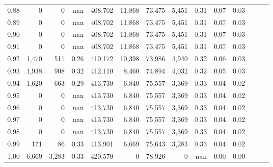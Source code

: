 \begin{tabular}{rrrrrrrrrrrrrr}
0.88 &       0 &      0 &   nan &  408,702 &   11,868 &  73,475 &   5,451 &  0.31 &  0.07 &      0.03 \\
0.89 &       0 &      0 &   nan &  408,702 &   11,868 &  73,475 &   5,451 &  0.31 &  0.07 &      0.03 \\
0.90 &       0 &      0 &   nan &  408,702 &   11,868 &  73,475 &   5,451 &  0.31 &  0.07 &      0.03 \\
0.91 &       0 &      0 &   nan &  408,702 &   11,868 &  73,475 &   5,451 &  0.31 &  0.07 &      0.03 \\
0.92 &   1,470 &    511 &  0.26 &  410,172 &   10,398 &  73,986 &   4,940 &  0.32 &  0.06 &      0.03 \\
0.93 &   1,938 &    908 &  0.32 &  412,110 &    8,460 &  74,894 &   4,032 &  0.32 &  0.05 &      0.03 \\
0.94 &   1,620 &    663 &  0.29 &  413,730 &    6,840 &  75,557 &   3,369 &  0.33 &  0.04 &      0.02 \\
0.95 &       0 &      0 &   nan &  413,730 &    6,840 &  75,557 &   3,369 &  0.33 &  0.04 &      0.02 \\
0.96 &       0 &      0 &   nan &  413,730 &    6,840 &  75,557 &   3,369 &  0.33 &  0.04 &      0.02 \\
0.97 &       0 &      0 &   nan &  413,730 &    6,840 &  75,557 &   3,369 &  0.33 &  0.04 &      0.02 \\
0.98 &       0 &      0 &   nan &  413,730 &    6,840 &  75,557 &   3,369 &  0.33 &  0.04 &      0.02 \\
0.99 &     171 &     86 &  0.33 &  413,901 &    6,669 &  75,643 &   3,283 &  0.33 &  0.04 &      0.02 \\
1.00 &   6,669 &  3,283 &  0.33 &  420,570 &        0 &  78,926 &       0 &   nan &  0.00 &      0.00 \\
\bottomrule
\end{tabular}
